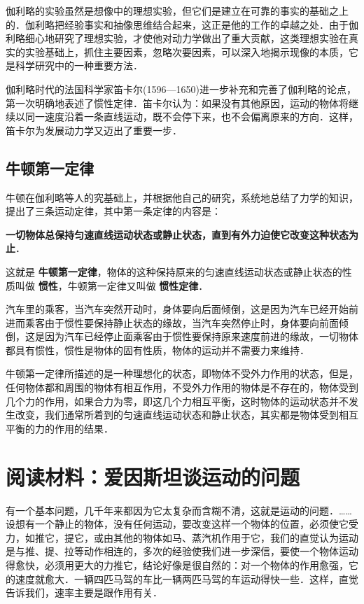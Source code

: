 \begin{Test}
伽利略的实验虽然是想像中的理想实验，但它们是建立在可靠的事实的基础之上的．伽利略把经验事实和抽像思维结合起来，这正是他的工作的卓越之处．由于伽利略细心地研究了理想实验，才使他对动力学做出了重大贡献，这类理想实验在真实的实验基础上，抓住主要因素，忽略次要因素，可以深入地揭示现像的本质，它是科学研究中的一种重要方法．

伽利略时代的法国科学家笛卡尔(1596—1650)进一步补充和完善了伽利略的论点，第一次明确地表述了惯性定律．笛卡尔认为：如果没有其他原因，运动的物体将继续以同一速度沿着一条直线运动，既不会停下来，也不会偏离原来的方向．这样，笛卡尔为发展动力学又迈出了重要一步．

\subsection{牛顿第一定律}
牛顿在伽利略等人的究基础上，并根据他自己的研究，系统地总结了力学的知识，提出了三条运动定律，其中第一条定律的内容是：

\textbf{ 一切物体总保持匀速直线运动状态或静止状态，直到有外力迫使它改变这种状态为止}．

这就是\textbf{ 牛顿第一定律}，物体的这种保持原来的匀速直线运动状态或静止状态的性质叫做\textbf{ 惯性}，牛顿第一定律又叫做\textbf{ 惯性定律}．

汽车里的乘客，当汽车突然开动时，身体要向后面倾倒，这是因为汽车已经开始前进而乘客由于惯性要保持静止状态的缘故，当汽车突然停止时，身体要向前面倾倒，这是因为汽车已经停止面乘客由于惯性要保持原来速度前进的缘故，一切物体都具有惯性，惯性是物体的固有性质，物体的运动并不需要力来维持．

牛顿第一定律所描述的是一种理想化的状态，即物体不受外力作用的状态，但是，任何物体都和周围的物体有相互作用，不受外力作用的物体是不存在的，物体受到几个力的作用，如果合力为零，即这几个力相互平衡，这时物体的运动状态并不发生改变，我们通常所着到的匀速直线运动状态和静止状态，其实都是物体受到相互平衡的力的作用的结果．

\section*{阅读材料：爱因斯坦谈运动的问题}
有一个基本问题，几千年来都因为它太复杂而含糊不清，这就是运动的问题．……设想有一个静止的物体，没有任何运动，要改变这样一个物体的位置，必须使它受力，如推它，提它，或由其他的物体如马、蒸汽机作用于它，我们的直觉认为运动是与推、提、拉等动作相连的，多次的经验使我们进一步深信，要使一个物体运动得愈快，必须用更大的力推它，结论好像是很自然的：对一个物体的作用愈强，它的速度就愈大．一辆四匹马驾的车比一辆两匹马驾的车运动得快一些．这样，直觉告诉我们，速率主要是跟作用有关．


\end{Test}
